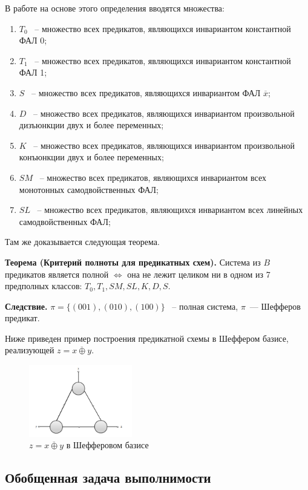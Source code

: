 \documentclass[12pt]{article}
\begin{document}
В работе \cite{Shu11} на основе этого определения вводятся множества:
\begin{enumerate}
\item $T_0$ ~-- множество всех предикатов, являющихся инвариантом константной ФАЛ 0;
\item $T_1$ ~-- множество всех предикатов, являющихся инвариантом константной ФАЛ 1;
\item $S$ ~-- множество всех предикатов, являющихся инвариантом ФАЛ $\overline{x}$;
\item $D$ ~-- множество всех предикатов, являющихся инвариантом произвольной дизъюнкции двух и более переменных;
\item $K$ ~-- множество всех предикатов, являющихся инвариантом произвольной конъюнкции двух и более переменных;
\item $SM$ ~-- множество всех предикатов, являющихся инвариантом всех монотонных самодвойственных ФАЛ;
\item $SL$ ~-- множество всех предикатов, являющихся инвариантом всех линейных самодвойственных ФАЛ;
\end{enumerate}

Там же доказывается следующая теорема.

\textbf{Теорема (Критерий полноты для предикатных схем).} Система из $B$ предикатов является полной $\iff$
она не лежит целиком ни в одном из 7 предполных классов: $T_0, T_1, SM, SL, K, D, S$. \cite{Shu11}

\textbf{Следствие.} $\pi = \{(001), (010), (100)\}  $ ~-- полная система, $\pi$~--- Шефферов предикат.

Ниже приведен пример построения предикатной схемы в Шеффером базисе, реализующей $z=\overline{x \oplus y}$.

\begin{figure}[htb]
\centering
\includegraphics[width=0.4\textwidth]{linear.png}
\caption{$z=\overline{x \oplus y}$ в Шефферовом базисе}
\label{fig:sheff}
\end{figure}

\subsection{Обобщенная задача выполнимости}
\end{document}
